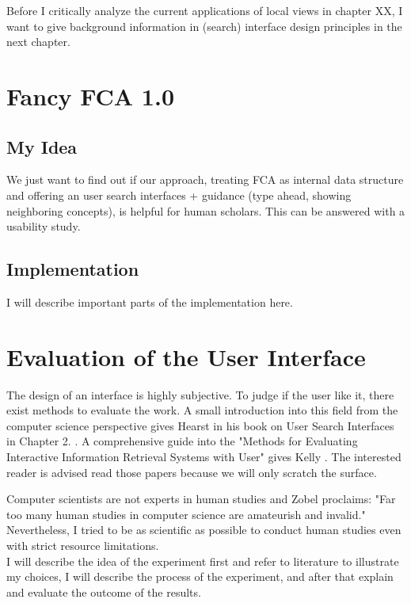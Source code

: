 \documentclass[11pt]{report}
\begin{document}
Before I critically analyze the current applications of local views in chapter XX, I want to give background information in (search) interface design principles in the next chapter.


\chapter{Fancy FCA 1.0}

\section{My Idea}

We just want to find out if our approach, treating FCA as internal data structure and offering an user search interfaces + guidance (type ahead, showing neighboring concepts), is helpful for human scholars. This can be answered with a usability study.

\section{Implementation}

I will describe important parts of the implementation here.

\chapter{Evaluation of the User Interface}

The design of an interface is highly subjective. To judge if the user like it, there exist methods to evaluate the work. A small introduction into this field from the computer science perspective gives Hearst in his book on User Search Interfaces in Chapter 2. \cite{Hearst2009}. A comprehensive guide into the "Methods for Evaluating Interactive Information Retrieval Systems with User" gives Kelly \cite{Kelly2007} . The interested reader is advised read those papers because we will only scratch the surface.


Computer scientists are not experts in human studies and Zobel \cite{Zobel2004} proclaims: "Far too many human studies in computer science are amateurish and invalid." Nevertheless, I tried to be as scientific as possible to conduct human studies even with strict resource limitations. \\

I will describe the idea of the experiment first and refer to literature to illustrate my choices, I will describe the process of the experiment, and after that explain and evaluate the outcome of the results.
\end{document}
